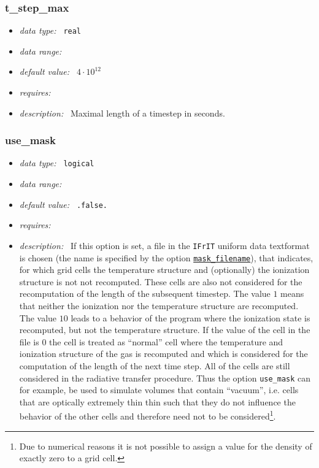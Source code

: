 \documentclass[a4paper,10pt]{article}
\begin{document}
\subsubsection{t\_step\_max}
\label{opt:tstepmax}
\begin{itemize}
 \item \textit{data type:~} \texttt{real}
 \item \textit{data range:~}
 \item \textit{default value:~} $4 \cdot 10^{12}$
 \item \textit{requires:~}
 \item \textit{description:~} Maximal length of a timestep in seconds.
\end{itemize}


\subsubsection{use\_mask}
\label{opt:usemask}
\begin{itemize}
 \item \textit{data type:~} \texttt{logical}
 \item \textit{data range:~}
 \item \textit{default value:~} \texttt{.false.}
 \item \textit{requires:~}
 \item \textit{description:~} If this option is set, a file in the 
 \texttt{IFrIT} uniform data textformat is chosen (the name is specified by the
 option \texttt{\hyperref[opt:maskfilename]{mask\_filename}}), that indicates, 
 for which grid cells the temperature structure and (optionally) the ionization
 structure is not not recomputed. These cells are also not considered for the 
 recomputation of the length of the subsequent timestep. The value $1$ means 
 that neither the ionization nor the temperature structure are recomputed.
 The value $10$ leads to a behavior of the program where the ionization state 
 is recomputed, but not the temperature structure. If the value of the cell in 
 the file is $0$ the cell is treated as ``normal'' cell where the temperature 
 and ionization structure of the gas is recomputed and which is considered
 for the computation of the length of the next time step. 
 All of the cells are still considered in the radiative transfer procedure.
 Thus the option \texttt{use\_mask} can for example, be used to simulate volumes
 that contain ``vacuum'', i.e. cells that are optically extremely thin thin 
 such that they do not influence the behavior of the other cells and therefore 
 need not to be considered\footnote{Due to numerical reasons it is not possible
 to assign a value for the density of exactly zero to a grid cell.}.    
\end{itemize}
\end{document}
